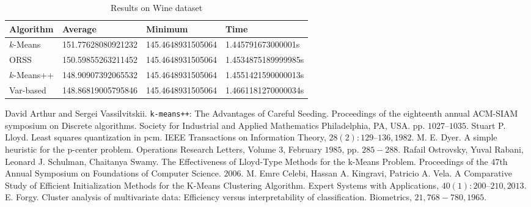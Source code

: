 \documentclass[10pt, leqno]{article}
\begin{document}
		\begin{table}[h]
			\begin{center}
				\begin{tabular}{|l|l|l|l|}
					\hline
					Algorithm & Average & Minimum & Time\\\hline
					$k$-Means &  151.77628080921232& 145.4648931505064& 1.445791673000001s\\\hline
					ORSS &  150.59855263211452& 145.4648931505064& 1.4534875189999985s\\\hline
					$k$-Means++ & 148.90907392065532& 145.4648931505064& 1.4551421590000013s\\\hline
					Var-based & 148.86819005795846& 145.4648931505064& 1.4661181270000034s\\\hline
				\end{tabular}
				\caption{Results on Wine dataset}
			\end{center}
			\label{tbl:mall}
		\end{table}
	\begin{thebibliography}{99}
		 David Arthur and Sergei Vassilvitskii. \texttt{k-means++}: The Advantages of Careful Seeding. Proceedings of the eighteenth annual ACM-SIAM symposium on Discrete algorithms. Society for Industrial and Applied Mathematics Philadelphia, PA, USA. pp. $1027–1035$.
		 Stuart P. Lloyd. Least squares quantization in pcm. IEEE Transactions on Information Theory, $28(2):129–136, 1982$.
		 M. E. Dyer. A simple heuristic for the p-center problem. Operations Research Letters, Volume $3$, February $1985$, pp. $285-288$.
		 Rafail Ostrovsky, Yuval Rabani, Leonard J. Schulman, Chaitanya Swamy. The Effectiveness of Lloyd-Type Methods for the k-Means Problem. Proceedings of the $47$th Annual Symposium on Foundations of Computer Science. $2006$.
		 M. Emre Celebi, Hassan A. Kingravi, Patricio A. Vela. A Comparative Study of Efficient Initialization Methods for the K-Means Clustering Algorithm. Expert Systems with Applications, $40(1): 200–210, 2013$.
		 E. Forgy. Cluster analysis of multivariate data: Efficiency versus interpretability of classification. Biometrics, $21, 768-780, 1965$.
	\end{thebibliography}
\end{document}
